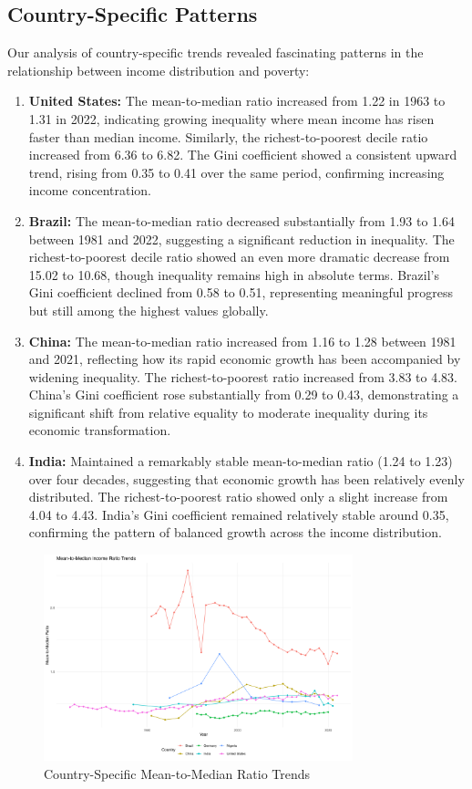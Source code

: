 \documentclass[12pt,a4paper]{article}
\begin{document}
\subsection{Country-Specific Patterns}
Our analysis of country-specific trends revealed fascinating patterns in the relationship between income distribution and poverty:
\begin{enumerate}
    \item \textbf{United States:} The mean-to-median ratio increased from 1.22 in 1963 to 1.31 in 2022, indicating growing inequality where mean income has risen faster than median income. Similarly, the richest-to-poorest decile ratio increased from 6.36 to 6.82. The Gini coefficient showed a consistent upward trend, rising from 0.35 to 0.41 over the same period, confirming increasing income concentration.
    \item \textbf{Brazil:} The mean-to-median ratio decreased substantially from 1.93 to 1.64 between 1981 and 2022, suggesting a significant reduction in inequality. The richest-to-poorest decile ratio showed an even more dramatic decrease from 15.02 to 10.68, though inequality remains high in absolute terms. Brazil's Gini coefficient declined from 0.58 to 0.51, representing meaningful progress but still among the highest values globally.
    \item \textbf{China:} The mean-to-median ratio increased from 1.16 to 1.28 between 1981 and 2021, reflecting how its rapid economic growth has been accompanied by widening inequality. The richest-to-poorest ratio increased from 3.83 to 4.83. China's Gini coefficient rose substantially from 0.29 to 0.43, demonstrating a significant shift from relative equality to moderate inequality during its economic transformation.
    \item \textbf{India:} Maintained a remarkably stable mean-to-median ratio (1.24 to 1.23) over four decades, suggesting that economic growth has been relatively evenly distributed. The richest-to-poorest ratio showed only a slight increase from 4.04 to 4.43. India's Gini coefficient remained relatively stable around 0.35, confirming the pattern of balanced growth across the income distribution.
\end{enumerate}

\begin{figure}[h]
\centering
\includegraphics[width=0.8\textwidth]{../output/visualizations/country_mean_median_trends.png}
\caption{Country-Specific Mean-to-Median Ratio Trends}
\end{figure}
\end{document}
